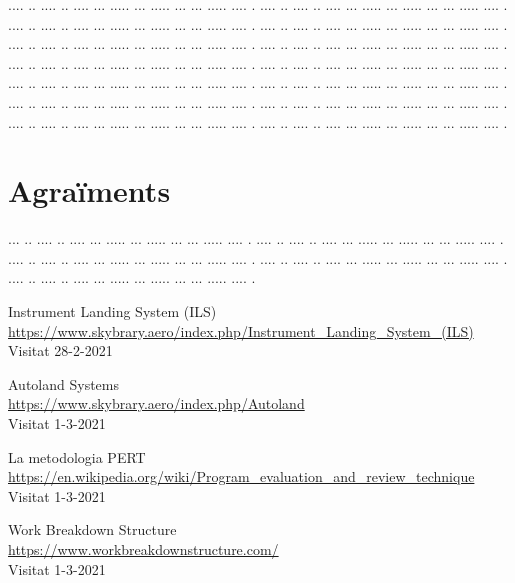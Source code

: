 \documentclass[10pt,a4paper,twocolumn,twoside]{article}
\begin{document}
.... ..  .... .. .... ... ..... ... ..... ... ... ..... .... .
.... ..  .... .. .... ... ..... ... ..... ... ... ..... .... .
.... ..  .... .. .... ... ..... ... ..... ... ... ..... .... .
.... ..  .... .. .... ... ..... ... ..... ... ... ..... .... .
.... ..  .... .. .... ... ..... ... ..... ... ... ..... .... .
.... ..  .... .. .... ... ..... ... ..... ... ... ..... .... .
.... ..  .... .. .... ... ..... ... ..... ... ... ..... .... .
.... ..  .... .. .... ... ..... ... ..... ... ... ..... .... .
.... ..  .... .. .... ... ..... ... ..... ... ... ..... .... .
.... ..  .... .. .... ... ..... ... ..... ... ... ..... .... .
.... ..  .... .. .... ... ..... ... ..... ... ... ..... .... .
.... ..  .... .. .... ... ..... ... ..... ... ... ..... .... .
.... ..  .... .. .... ... ..... ... ..... ... ... ..... .... .
.... ..  .... .. .... ... ..... ... ..... ... ... ..... .... .

\section*{Agraïments}

... ..  .... .. .... ... ..... ... ..... ... ... ..... .... .
.... ..  .... .. .... ... ..... ... ..... ... ... ..... .... .
.... ..  .... .. .... ... ..... ... ..... ... ... ..... .... .
.... ..  .... .. .... ... ..... ... ..... ... ... ..... .... .
.... ..  .... .. .... ... ..... ... ..... ... ... ..... .... .

\begin{thebibliography}{9}
Instrument Landing System (ILS)
\\\url{https://www.skybrary.aero/index.php/Instrument_Landing_System_(ILS)}
\\Visitat 28-2-2021

Autoland Systems
\\\url{https://www.skybrary.aero/index.php/Autoland}
\\Visitat 1-3-2021

La metodologia PERT
\\\url{https://en.wikipedia.org/wiki/Program_evaluation_and_review_technique}
\\Visitat 1-3-2021

Work Breakdown Structure
\\\url{https://www.workbreakdownstructure.com/}
\\Visitat 1-3-2021

\end{thebibliography}
\end{document}
